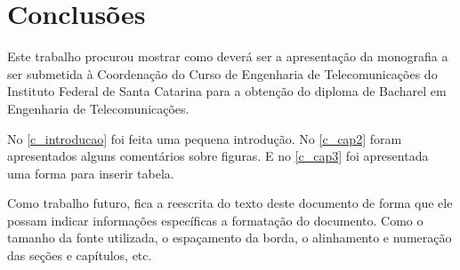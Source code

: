\chapter{Conclusões}
\label{c_conclusoes}

Este trabalho procurou mostrar como deverá ser a apresentação da monografia a ser submetida à Coordenação do Curso de Engenharia de Telecomunicações do Instituto Federal de Santa Catarina para a obtenção do diploma de Bacharel em Engenharia de Telecomunicações.

No \autoref{c_introducao} foi feita uma pequena introdução. No \autoref{c_cap2} foram apresentados alguns comentários sobre figuras. E no \autoref{c_cap3} foi apresentada uma forma para inserir tabela.

Como trabalho futuro, fica a reescrita do texto deste documento de forma que ele possam indicar informações específicas a formatação do documento. Como o tamanho da fonte utilizada, o espaçamento da borda, o alinhamento e numeração das seções e capítulos, etc.